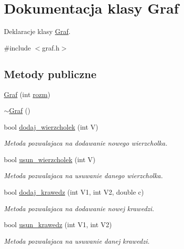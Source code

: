 \hypertarget{class_graf}{\section{\-Dokumentacja klasy \-Graf}
\label{class_graf}
}


\-Deklaracje klasy \hyperlink{class_graf}{\-Graf}.  




{\ttfamily \#include $<$graf.\-h$>$}

\subsection*{\-Metody publiczne}
\begin{DoxyCompactItemize}
\item 
\hyperlink{class_graf_a697a2852c7f65779f23e30fd0e8dd081}{\-Graf} (int \hyperlink{class_graf_aac4d211e752539963f002d255991f5b4}{rozm})
\item 
\hyperlink{class_graf_a4ff3904fd04f367ac0219b52719c567e}{$\sim$\-Graf} ()
\item 
bool \hyperlink{class_graf_abffb5a92e6eeb623fb319a1cd9f6de62}{dodaj\-\_\-wierzcholek} (int \-V)
\begin{DoxyCompactList}\small\item\em \-Metoda pozwalajaca na dodawanie nowego wierzcholka. \end{DoxyCompactList}\item 
bool \hyperlink{class_graf_a3e263338d6b137fd9e1b0b47a741a03f}{usun\-\_\-wierzcholek} (int \-V)
\begin{DoxyCompactList}\small\item\em \-Metoda pozwalajaca na usuwanie danego wierzcholka. \end{DoxyCompactList}\item 
bool \hyperlink{class_graf_a0024231b77bddd7298a66e0b753b5d6b}{dodaj\-\_\-krawedz} (int \-V1, int \-V2, double c)
\begin{DoxyCompactList}\small\item\em \-Metoda pozwalajaca na dodawanie nowej krawedzi. \end{DoxyCompactList}\item 
bool \hyperlink{class_graf_a8db1f54a88cbb1ec04a2337a59c864e8}{usun\-\_\-krawedz} (int \-V1, int \-V2)
\begin{DoxyCompactList}\small\item\em \-Metoda pozwalajaca na usuwanie danej krawedzi. \end{DoxyCompactList}\item 

\end{DoxyCompactItemize}
